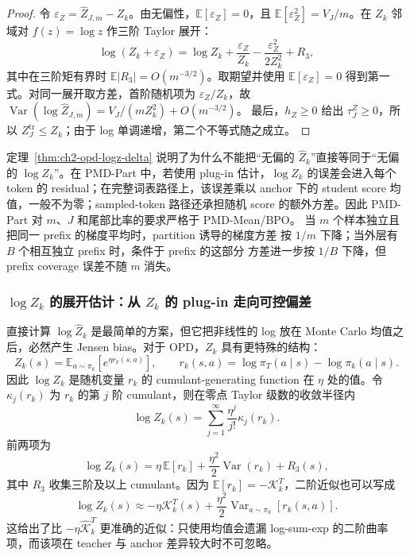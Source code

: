 \begin{proof}
令 $\varepsilon_Z=\widehat Z_{J,m}-Z_k$。由无偏性，$\mathbb E[\varepsilon_Z]=0$，且
$\mathbb E[\varepsilon_Z^2]=V_J/m$。在 $Z_k$ 邻域对
$f(z)=\log z$ 作三阶 Taylor 展开：
\begin{equation}
\log(Z_k+\varepsilon_Z)=\log Z_k+\frac{\varepsilon_Z}{Z_k}
 -\frac{\varepsilon_Z^2}{2Z_k^2}+R_3,
\end{equation}
其中在三阶矩有界时 $\mathbb E|R_3|=O(m^{-3/2})$。取期望并使用
$\mathbb E[\varepsilon_Z]=0$ 得到第一式。对同一展开取方差，首阶随机项为
$\varepsilon_Z/Z_k$，故
$\operatorname{Var}(\log\widehat Z_{J,m})=V_J/(mZ_k^2)+O(m^{-3/2})$。
最后，$h_Z\ge0$ 给出 $\tau_J^Z\ge0$，所以
$Z_J^{\mathrm{tr}}\le Z_k$；由于 log 单调递增，第二个不等式随之成立。
\end{proof}

定理~\ref{thm:ch2-opd-logz-delta} 说明了为什么不能把“无偏的
$\widehat Z_k$”直接等同于“无偏的 $\log Z_k$”。在 PMD-Part 中，若使用
plug-in 估计，$\log Z_k$ 的误差会进入每个 token 的 residual；在完整词表路径上，该误差乘以 anchor 下的 student score 均值，一般不为零；sampled-token 路径还承担随机 score 的额外方差。因此 PMD-Part 对 $m$、$J$ 和尾部比率的要求严格于 PMD-Mean/BPO。
当 $m$ 个样本独立且把同一 prefix 的梯度平均时，partition 诱导的梯度方差
按 $1/m$ 下降；当外层有 $B$ 个相互独立 prefix 时，条件于 prefix 的这部分
方差进一步按 $1/B$ 下降，但 prefix coverage 误差不随 $m$ 消失。

\subsubsection*{$\log Z_k$ 的展开估计：从 $Z_k$ 的 plug-in 走向可控偏差}
直接计算 $\log\widehat Z_k$ 是最简单的方案，但它把非线性的 log 放在 Monte
Carlo 均值之后，必然产生 Jensen bias。对于 OPD，$Z_k$ 具有更特殊的结构：
\begin{equation}
Z_k(s)=\mathbb E_{a\sim\pi_k}\left[e^{\eta r_k(s,a)}\right],
\qquad
r_k(s,a)=\log \pi_T(a\mid s)-\log\pi_k(a\mid s).
\label{eq:ch2-opd-z-cumulant-start}
\end{equation}
因此 $\log Z_k$ 是随机变量 $r_k$ 的 cumulant-generating function 在
$\eta$ 处的值。令 $\kappa_j(r_k)$ 为 $r_k$ 的第 $j$ 阶 cumulant，则在零点 Taylor 级数的收敛半径内
\begin{equation}
\log Z_k(s)=\sum_{j=1}^{\infty}\frac{\eta^j}{j!}\kappa_j(r_k).
\label{eq:ch2-opd-logz-cumulant-series}
\end{equation}
前两项为
\begin{equation}
\log Z_k(s)=\eta\,\mathbb E[r_k]
 +\frac{\eta^2}{2}\operatorname{Var}(r_k)
 +R_3(s),
\label{eq:ch2-opd-logz-second-order}
\end{equation}
其中 $R_3$ 收集三阶及以上 cumulant。因为
$\mathbb E[r_k]=-\mathcal K_k^{T}$，二阶近似也可以写成
\begin{equation}
\log Z_k(s)\approx-\eta \mathcal K_k^{T}(s)
 +\frac{\eta^2}{2}\operatorname{Var}_{a\sim\pi_k}[r_k(s,a)].
\label{eq:ch2-opd-logz-kl-expansion}
\end{equation}
这给出了比 $-\eta\widehat{\mathcal K}_k^T$ 更准确的近似：只使用均值会遗漏
log-sum-exp 的二阶曲率项，而该项在 teacher 与 anchor 差异较大时不可忽略。


